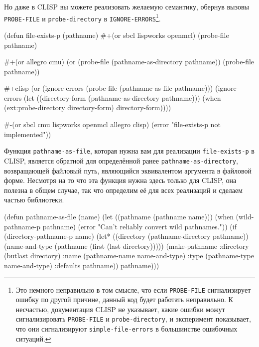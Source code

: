 Но даже в CLISP вы можете реализовать желаемую семантику, обернув вызовы \lstinline{PROBE-FILE}
и \lstinline{probe-directory} в \lstinline{IGNORE-ERRORS}\footnote{Это немного неправильно в том
  смысле, что если \lstinline{PROBE-FILE} сигнализирует ошибку по другой причине, данный код
  будет работать неправильно. К несчастью, документация CLISP не указывает, какие ошибки
  можут сигнализировать \lstinline{PROBE-FILE} и \lstinline{probe-directory}, и эксперимент
  показывает, что они сигнализируют \lstinline{simple-file-errors} в большинстве ошибочных
  ситуаций.}\hspace{\footnotenegspace}.

\begin{myverb}
(defun file-exists-p (pathname)
  #+(or sbcl lispworks openmcl)
  (probe-file pathname)

  #+(or allegro cmu)
  (or (probe-file (pathname-as-directory pathname))
      (probe-file pathname))

  #+clisp
  (or (ignore-errors
        (probe-file (pathname-as-file pathname)))
      (ignore-errors
        (let ((directory-form (pathname-as-directory pathname)))
          (when (ext:probe-directory directory-form)
            directory-form))))

  #-(or sbcl cmu lispworks openmcl allegro clisp)
  (error "file-exists-p not implemented"))
\end{myverb}

Функция \lstinline{pathname-as-file}, которая нужна вам для реализации \lstinline{file-exists-p} в
CLISP, является обратной для определённой ранее \lstinline{pathname-as-directory}, возвращающей
файловый путь, являющийся эквивалентом аргумента в файловой форме. Несмотря на то что эта
функция нужна здесь только для CLISP, она полезна в общем случае, так что определим её для
всех реализаций и сделаем частью библиотеки.

\begin{myverb}
(defun pathname-as-file (name)
  (let ((pathname (pathname name)))
    (when (wild-pathname-p pathname)
      (error "Can't reliably convert wild pathnames."))
    (if (directory-pathname-p name)
      (let* ((directory (pathname-directory pathname))
             (name-and-type (pathname (first (last directory)))))
        (make-pathname
         :directory (butlast directory)
         :name (pathname-name name-and-type)
         :type (pathname-type name-and-type)
         :defaults pathname))
      pathname)))
\end{myverb}

